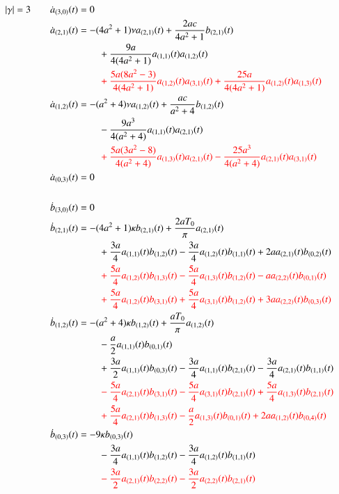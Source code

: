 \begin{align*}
|\gamma| = 3
\qquad &
\dot{a}_{(3,0)}(t) = 0
\\
&
\dot{a}_{(2,1)}(t)
=
-
(4 a^2+1)
\nu
a_{(2,1)}(t)
+
\frac{2 a c}{4 a^2+1} b_{(2,1)}(t)
\\
&\phantom{aaaaaaaaaa}
+
\frac{9 a}{4 (4 a^2+1)} a_{(1,1)}(t) a_{(1,2)}(t)
\\
&\phantom{aaaaaaaaaa}
\color{red}
+
\frac{5 a (8 a^2 - 3)}{4 (4 a^2+1)} a_{(1,2)}(t) a_{(3,1)}(t)
+
\frac{25 a}{4 (4 a^2+1)} a_{(1,2)}(t) a_{(1,3)}(t)
\\
&
\dot{a}_{(1,2)}(t)
=
-
(a^2+4)
\nu
a_{(1,2)}(t)
+
\frac{a c}{a^2+4} b_{(1,2)}(t)
\\
&\phantom{aaaaaaaaaa}
-
\frac{9 a^3}{4 (a^2+4)} a_{(1,1)}(t) a_{(2,1)}(t)
\\
&\phantom{aaaaaaaaaa}
\color{red}
+
\frac{5 a (3 a^2 - 8)}{4 (a^2+4)} a_{(1,3)}(t) a_{(2,1)}(t)
-
\frac{25 a^3}{4 (a^2+4)} a_{(2,1)}(t) a_{(3,1)}(t)
\\
&
\dot{a}_{(0,3)}(t) = 0
\\
\\
&
\dot{b}_{(3,0)}(t) = 0
\\
&
\dot{b}_{(2,1)}(t)
=
-
(4 a^2+1)
\kappa
b_{(2,1)}(t)
+
\frac{2 a T_{0}}{\pi} a_{(2,1)}(t)
\\
&\phantom{aaaaaaaaaa}
+
\frac{3 a}{4} a_{(1,1)}(t) b_{(1,2)}(t)
-
\frac{3 a}{4} a_{(1,2)}(t) b_{(1,1)}(t)
+
2 a
a_{(2,1)}(t) b_{(0,2)}(t)
\\
&\phantom{aaaaaaaaaa}
\color{red}
+
\frac{5 a}{4} a_{(1,2)}(t) b_{(1,3)}(t)
-
\frac{5 a}{4} a_{(1,3)}(t) b_{(1,2)}(t)
-
a
a_{(2,2)}(t) b_{(0,1)}(t)
\\
&\phantom{aaaaaaaaaa}
\color{red}
+
\frac{5 a}{4} a_{(1,2)}(t) b_{(3,1)}(t)
+
\frac{5 a}{4} a_{(3,1)}(t) b_{(1,2)}(t)
+
3 a
a_{(2,2)}(t) b_{(0,3)}(t)
\\
&
\dot{b}_{(1,2)}(t)
=
-
(a^2+4)
\kappa
b_{(1,2)}(t)
+
\frac{a T_{0}}{\pi} a_{(1,2)}(t)
\\
&\phantom{aaaaaaaaaa}
-
\frac{a}{2} a_{(1,1)}(t) b_{(0,1)}(t)
\\
&\phantom{aaaaaaaaaa}
+
\frac{3 a}{2} a_{(1,1)}(t) b_{(0,3)}(t)
-
\frac{3 a}{4} a_{(1,1)}(t) b_{(2,1)}(t)
-
\frac{3 a}{4} a_{(2,1)}(t) b_{(1,1)}(t)
\\
&\phantom{aaaaaaaaaa}
\color{red}
-
\frac{5 a}{4} a_{(2,1)}(t) b_{(3,1)}(t)
-
\frac{5 a}{4} a_{(3,1)}(t) b_{(2,1)}(t)
+
\frac{5 a}{4} a_{(1,3)}(t) b_{(2,1)}(t)
\\
&\phantom{aaaaaaaaaa}
\color{red}
+
\frac{5 a}{4} a_{(2,1)}(t) b_{(1,3)}(t)
-
\frac{a}{2} a_{(1,3)}(t) b_{(0,1)}(t)
+
2 a
a_{(1,2)}(t) b_{(0,4)}(t)
\\
&
\dot{b}_{(0,3)}(t)
=
-
9
\kappa
b_{(0,3)}(t)
\\
&\phantom{aaaaaaaaaa}
-
\frac{3 a}{4} a_{(1,1)}(t) b_{(1,2)}(t)
-
\frac{3 a}{4} a_{(1,2)}(t) b_{(1,1)}(t)
\\
&\phantom{aaaaaaaaaa}
\color{red}
-
\frac{3 a}{2} a_{(2,1)}(t) b_{(2,2)}(t)
-
\frac{3 a}{2} a_{(2,2)}(t) b_{(2,1)}(t)
\end{align*}
